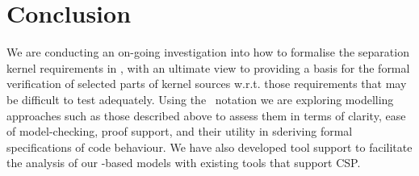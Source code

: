 \section{Conclusion}

We are conducting an on-going investigation into how to formalise
the separation kernel requirements in \cite{IMAKQP-D02},
with an ultimate view to providing a basis for the formal verification
of selected parts of kernel sources w.r.t. those requirements that
may be difficult to test adequately.
Using the \Circus\ notation we are exploring modelling approaches
such as those described above
to assess them in terms of clarity, ease of model-checking, proof support,
and their utility in sderiving formal specifications of code behaviour.
We have also developed tool support to facilitate the analysis
of our \Circus-based models
with existing tools that support CSP.
